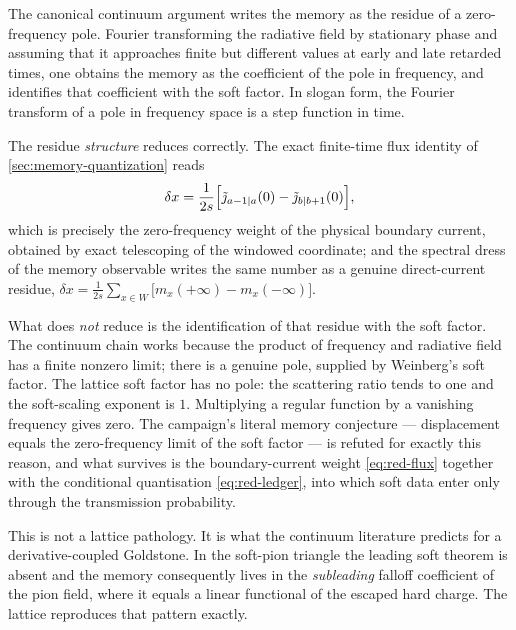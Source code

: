 The canonical continuum argument writes the memory as the residue of a
zero-frequency pole. Fourier transforming the radiative field by stationary
phase and assuming that it approaches finite but different values at early and
late retarded times, one obtains the memory as the coefficient of the pole in
frequency, and identifies that coefficient with the soft factor. In slogan form,
the Fourier transform of a pole in frequency space is a step function in time.

The residue \emph{structure} reduces correctly. The exact finite-time flux
identity of \cref{sec:memory-quantization} reads
\begin{equation}
  \delta x=\frac{1}{2s}\Bigl[\tilde{\jmath}_{a-1|a}(0)-\tilde{\jmath}_{b|b+1}(0)\Bigr],
  \label{eq:red-flux}
\end{equation}
which is precisely the zero-frequency weight of the physical boundary current,
obtained by exact telescoping of the windowed coordinate; and the spectral dress
of the memory observable writes the same number as a genuine direct-current
residue, $\delta x=\frac{1}{2s}\sum_{x\in W}\bigl[m_x(+\infty)-m_x(-\infty)\bigr]$.

What does \emph{not} reduce is the identification of that residue with the soft
factor. The continuum chain works because the product of frequency and radiative
field has a finite nonzero limit; there is a genuine pole, supplied by
Weinberg's soft factor. The lattice soft factor has no pole: the scattering
ratio tends to one and the soft-scaling exponent is $1$. Multiplying a regular
function by a vanishing frequency gives zero. The campaign's literal memory
conjecture --- displacement equals the zero-frequency limit of the soft factor
--- is refuted for exactly this reason, and what survives is the boundary-current
weight \eqref{eq:red-flux} together with the conditional quantisation
\eqref{eq:red-ledger}, into which soft data enter only through the transmission
probability.


This is not a lattice pathology. It is what the continuum literature predicts
for a derivative-coupled Goldstone. In the soft-pion triangle the leading soft
theorem is absent and the memory consequently lives in the \emph{subleading}
falloff coefficient of the pion field, where it equals a linear functional of
the escaped hard charge. The lattice reproduces that pattern exactly.

